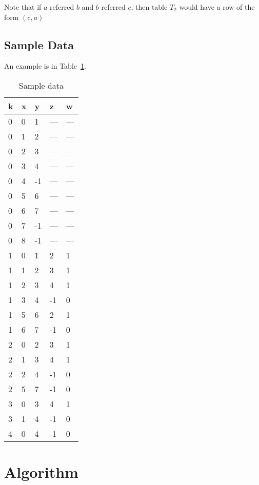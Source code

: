 Note that if \(a\) referred \(b\) and \(b\) referred \(c\), then table \(T_2\)
would have a row of the form \((c, a)\)

\subsection{Sample Data}
An example is in Table~\ref{example_extend}. 
\begin{table}[hp]
\centering
\begin{tabular} {|l|l|l|l|l|} \hline \hline
{\bf k} & {\bf x} & {\bf y} & {\bf z} & {\bf w} \\ \hline
0 & 0 & 1  & --- & --- \\ \hline
0 & 1 & 2  & --- & --- \\ \hline
0 & 2 & 3  & --- & --- \\ \hline
0 & 3 & 4  & --- & --- \\ \hline
0 & 4 & -1 & --- & --- \\\hline
0 & 5 & 6  &  --- & --- \\\hline
0 & 6 & 7  &  --- & --- \\\hline
0 & 7 & -1 &  --- & --- \\\hline
0 & 8 & -1 &  --- & --- \\\hline
\hline  \hline
1 & 0 & 1  & 2  & 1 \\ \hline
1 & 1 & 2  & 3  & 1 \\ \hline
1 & 2 & 3  & 4  & 1 \\ \hline
1 & 3 & 4  & -1 & 0 \\ \hline
1 & 5 & 6  & 2  & 1 \\ \hline
1 & 6 & 7  & -1 & 0 \\ \hline
\hline  \hline
2 & 0 & 2 & 3 & 1 \\ \hline
2 & 1 & 3 & 4 & 1 \\ \hline
2 & 2 & 4 & -1 & 0 \\ \hline
2 & 5 & 7 & -1 & 0 \\ \hline
\hline  \hline
3 & 0 & 3 & 4 & 1 \\ \hline
3 & 1 & 4 & -1 & 0 \\ \hline
\hline  \hline
4 & 0 & 4 & -1 & 0 \\ \hline
\end{tabular}
\caption{Sample data}
\label{example_extend}
\end{table}


\section{Algorithm}

